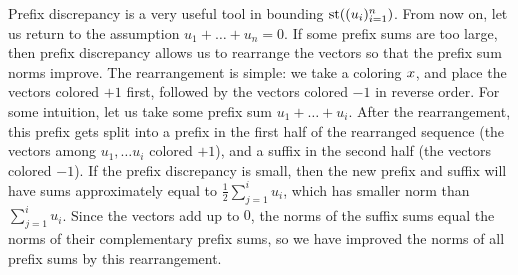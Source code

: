 Prefix discrepancy is a very useful tool in bounding $\operatorname{st}((u_i)_{i=1}^n)$. From now on, let us return to the assumption $u_1 + \ldots + u_n = 0$. If some prefix sums are too large, then prefix discrepancy allows us to rearrange the vectors so that the prefix sum norms improve. The rearrangement is simple: we take a coloring $x$, and place the vectors colored $+1$ first, followed by the vectors colored $-1$ in reverse order. For some intuition, let us take some prefix sum $u_1 + \ldots + u_i$. After the rearrangement, this prefix gets split into a prefix in the first half of the rearranged sequence (the vectors among $u_1, \ldots u_i$ colored $+1$), and a suffix in the second  half (the vectors colored $-1$). If the prefix discrepancy is small, then the new prefix and suffix will have sums approximately equal to $\frac12 \sum_{j = 1}^i u_i$, which has smaller norm than $\sum_{j = 1}^i u_i$. Since the vectors add up to $0$, the norms of the suffix sums equal the norms of their complementary prefix sums, so we have improved the norms of all prefix sums by this rearrangement.

